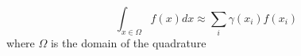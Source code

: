 % 
% 

\begin{equation}
  \int_{x \in \Omega} f(x) dx \approx \sum_{i} \gamma(x_i) f(x_i)
\label{eq:quadrature}
\end{equation}
where $\Omega$ is the domain of the quadrature

% 
